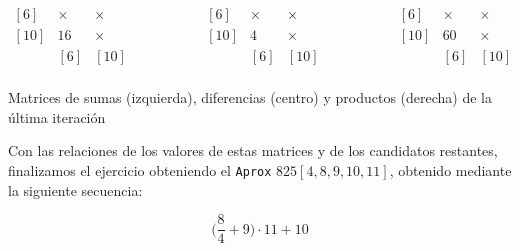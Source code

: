 \begin{center}
$\begin{matrix}
[6]  & \times & \times \\
[10] & 16     & \times \\
     &   [6]  &  [10]  \\
\end{matrix}
\ \ \ \ \ \ \ \ \ \ \ \ \ \ \ \ \ \ \ \ \ \ \begin{matrix}
[6]  & \times & \times \\
[10] & 4      & \times \\
     &   [6]  &  [10]  \\
\end{matrix}
\ \ \ \ \ \ \ \ \ \ \ \ \ \ \ \ \ \ \ \ \ \ \begin{matrix}
[6]  & \times & \times \\
[10] & 60     & \times \\
     &   [6]  &  [10]  \\
\end{matrix}$

Matrices de sumas (izquierda), diferencias (centro) y productos (derecha) de la última iteración
\end{center}

Con las relaciones de los valores de estas matrices y de los candidatos restantes, finalizamos el ejercicio obteniendo el \texttt{Aprox} $825[4,8,9,10,11]$, obtenido mediante la siguiente secuencia:

\begin{center}
\[\bigg(\frac{8}{4}+9\bigg)\cdot11+10\]
\end{center}
